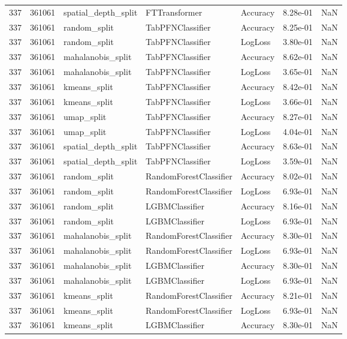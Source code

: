 \begin{tabular}{rrlllrr}
337 & 361061 & spatial\_depth\_split & FTTransformer & Accuracy & 8.28e-01 & NaN \\
337 & 361061 & random\_split & TabPFNClassifier & Accuracy & 8.25e-01 & NaN \\
337 & 361061 & random\_split & TabPFNClassifier & LogLoss & 3.80e-01 & NaN \\
337 & 361061 & mahalanobis\_split & TabPFNClassifier & Accuracy & 8.62e-01 & NaN \\
337 & 361061 & mahalanobis\_split & TabPFNClassifier & LogLoss & 3.65e-01 & NaN \\
337 & 361061 & kmeans\_split & TabPFNClassifier & Accuracy & 8.42e-01 & NaN \\
337 & 361061 & kmeans\_split & TabPFNClassifier & LogLoss & 3.66e-01 & NaN \\
337 & 361061 & umap\_split & TabPFNClassifier & Accuracy & 8.27e-01 & NaN \\
337 & 361061 & umap\_split & TabPFNClassifier & LogLoss & 4.04e-01 & NaN \\
337 & 361061 & spatial\_depth\_split & TabPFNClassifier & Accuracy & 8.63e-01 & NaN \\
337 & 361061 & spatial\_depth\_split & TabPFNClassifier & LogLoss & 3.59e-01 & NaN \\
337 & 361061 & random\_split & RandomForestClassifier & Accuracy & 8.02e-01 & NaN \\
337 & 361061 & random\_split & RandomForestClassifier & LogLoss & 6.93e-01 & NaN \\
337 & 361061 & random\_split & LGBMClassifier & Accuracy & 8.16e-01 & NaN \\
337 & 361061 & random\_split & LGBMClassifier & LogLoss & 6.93e-01 & NaN \\
337 & 361061 & mahalanobis\_split & RandomForestClassifier & Accuracy & 8.30e-01 & NaN \\
337 & 361061 & mahalanobis\_split & RandomForestClassifier & LogLoss & 6.93e-01 & NaN \\
337 & 361061 & mahalanobis\_split & LGBMClassifier & Accuracy & 8.30e-01 & NaN \\
337 & 361061 & mahalanobis\_split & LGBMClassifier & LogLoss & 6.93e-01 & NaN \\
337 & 361061 & kmeans\_split & RandomForestClassifier & Accuracy & 8.21e-01 & NaN \\
337 & 361061 & kmeans\_split & RandomForestClassifier & LogLoss & 6.93e-01 & NaN \\
337 & 361061 & kmeans\_split & LGBMClassifier & Accuracy & 8.30e-01 & NaN \\

\end{tabular}
